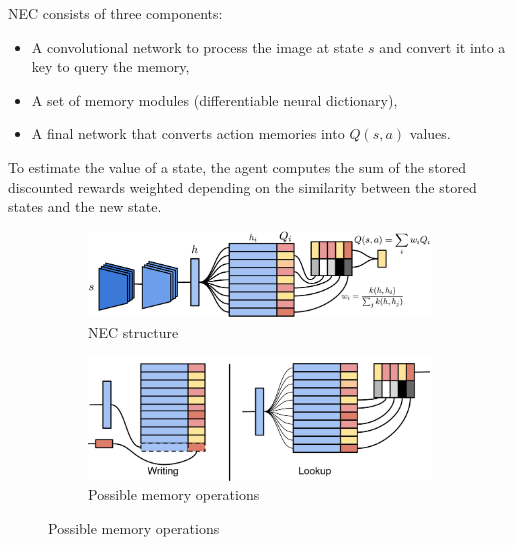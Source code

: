 \begin{description}
\begin{casestudy}
            NEC consists of three components:
            \begin{itemize}
                \item A convolutional network to process the image at state $s$ and convert it into a key to query the memory,
                \item A set of memory modules (differentiable neural dictionary),
                \item A final network that converts action memories into $Q(s, a)$ values.
            \end{itemize}
            To estimate the value of a state, the agent computes the sum of the stored discounted rewards weighted depending on the similarity between the stored states and the new state.

            \begin{figure}[H]
                \centering
                \begin{subfigure}{0.56\linewidth}
                    \centering
                    \includegraphics[width=0.95\linewidth]{./img/nec1.png}
                    \caption{NEC structure}
                \end{subfigure}
                \begin{subfigure}{0.42\linewidth}
                    \centering
                    \includegraphics[width=0.95\linewidth]{./img/nec2.png}
                    \caption{Possible memory operations}
                \end{subfigure}
            \end{figure}


\end{casestudy}
\end{description}
